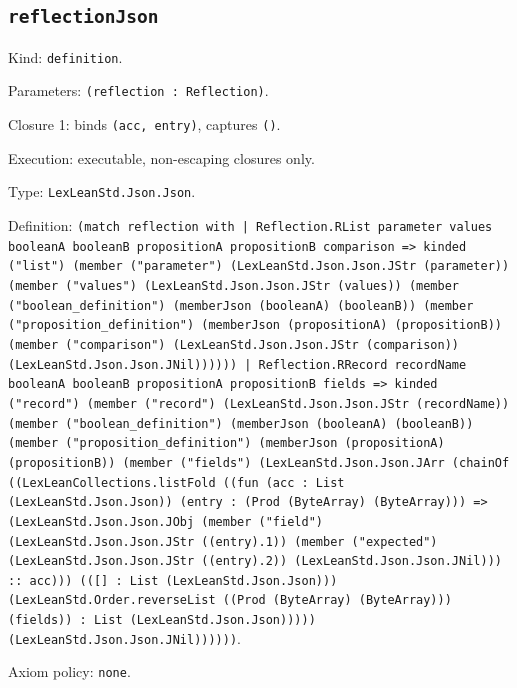 \documentclass[11pt]{article}
\begin{document}
\subsection*{\texttt{reflectionJson}}
\noindent Kind: \texttt{definition}.\par
\noindent Parameters: \texttt{(reflection : Reflection)}.\par
\noindent Closure 1: binds \texttt{(acc, entry)}, captures \texttt{()}.\par
\noindent Execution: executable, non-escaping closures only.\par
\noindent Type: \texttt{LexLeanStd.Json.Json}.\par
\noindent Definition: \texttt{(match reflection with | Reflection.RList parameter values booleanA booleanB propositionA propositionB comparison => kinded ("list") (member ("parameter") (LexLeanStd.Json.Json.JStr (parameter)) (member ("values") (LexLeanStd.Json.Json.JStr (values)) (member ("boolean\_definition") (memberJson (booleanA) (booleanB)) (member ("proposition\_definition") (memberJson (propositionA) (propositionB)) (member ("comparison") (LexLeanStd.Json.Json.JStr (comparison)) (LexLeanStd.Json.Json.JNil)))))) | Reflection.RRecord recordName booleanA booleanB propositionA propositionB fields => kinded ("record") (member ("record") (LexLeanStd.Json.Json.JStr (recordName)) (member ("boolean\_definition") (memberJson (booleanA) (booleanB)) (member ("proposition\_definition") (memberJson (propositionA) (propositionB)) (member ("fields") (LexLeanStd.Json.Json.JArr (chainOf ((LexLeanCollections.listFold ((fun (acc : List (LexLeanStd.Json.Json)) (entry : (Prod (ByteArray) (ByteArray))) => (LexLeanStd.Json.Json.JObj (member ("field") (LexLeanStd.Json.Json.JStr ((entry).1)) (member ("expected") (LexLeanStd.Json.Json.JStr ((entry).2)) (LexLeanStd.Json.Json.JNil))) :: acc))) (([] : List (LexLeanStd.Json.Json))) (LexLeanStd.Order.reverseList ((Prod (ByteArray) (ByteArray))) (fields)) : List (LexLeanStd.Json.Json))))) (LexLeanStd.Json.Json.JNil))))))}.\par
\noindent Axiom policy: \texttt{none}.\par
\end{document}
